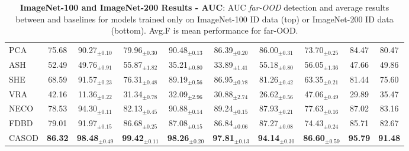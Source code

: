 \begin{table}[t!]
{\begin{tabular}{|l|c|cccccc|c|c|}
PCA\cite{guan2023revisit}    & 75.68 & 90.27$_{\pm 0.10}$ & 79.96$_{\pm 0.30}$ & 90.48$_{\pm 0.13}$ & 86.39$_{\pm 0.20}$ & 86.00$_{\pm 0.31}$ & 73.70$_{\pm 0.25}$ & 84.47 & 80.47 \\
ASH\cite{djurisic2022extremely}    &  52.49 & 49.76$_{\pm 0.91}$ & 55.87$_{\pm 1.82}$ & 35.21$_{\pm 0.80}$ & 33.89$_{\pm 1.41}$ & 55.18$_{\pm 0.80}$ & 56.05$_{\pm 1.36}$ & 47.66 & 49.86 \\
SHE\cite{zhang2022out}    &  68.59 & 91.57$_{\pm 0.23}$ & 76.31$_{\pm 0.48}$ & 89.19$_{\pm 0.56}$ & 86.95$_{\pm 0.78}$ & 81.26$_{\pm 0.42}$ & 63.35$_{\pm 0.21}$ & 81.44 & 75.60 \\
VRA\cite{xu2024vra}    &  42.16 & 11.36$_{\pm 0.22}$ & 31.34$_{\pm 0.78}$ & 32.09$_{\pm 2.96}$ & 30.88$_{\pm 2.74}$ & 26.62$_{\pm 0.56}$ & 47.06$_{\pm 0.49}$ & 29.89 & 35.47 \\
NECO\cite{ammar2024neco}   & 78.53 & 94.30$_{\pm 0.11}$ & 82.13$_{\pm 0.45}$ & 90.88$_{\pm 0.14}$ & 89.24$_{\pm 0.15}$ & 87.93$_{\pm 0.21}$ & 77.63$_{\pm 0.16}$ & 87.02 & 83.16 \\
FDBD\cite{liu2024fast}   & 79.01 & 91.97$_{\pm 0.15}$ & 86.68$_{\pm 0.25}$ & 87.08$_{\pm 0.15}$ & 86.84$_{\pm 0.06}$ & 87.27$_{\pm 0.08}$ & 74.43$_{\pm 0.24}$ & 85.71 & 82.67 \\ \hline
CASOD  &  \textbf{86.32} & \textbf{98.48}$_{\pm 0.49}$ & \textbf{99.42}$_{\pm 0.11}$ & \textbf{98.26}$_{\pm 0.20}$ & \textbf{97.81}$_{\pm 0.13}$ & \textbf{94.14}$_{\pm 0.30}$ & \textbf{86.60}$_{\pm 0.59}$ & \textbf{95.79} & \textbf{91.48} \\ \hline
		\end{tabular}
	}
	\caption{\textbf{ImageNet-100 and ImageNet-200 Results - AUC}: AUC \textit{far-OOD} detection and average results between \sys and baselines for models trained only on ImageNet-100 ID data (top) or ImageNet-200 ID data (bottom). %
    Avg.F is mean performance for far-OOD. %
    }
	\label{tab:table_ood_auc_f}
\end{table}

